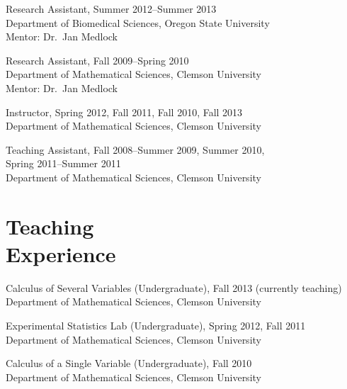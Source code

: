 \documentclass[margin,line,pifont,palatino,courier]{res}
\begin{document}
\begin{resume}
Research Assistant, Summer 2012--Summer 2013 \\
Department of Biomedical Sciences, Oregon State University \\
Mentor: Dr.~Jan Medlock


Research Assistant, Fall 2009--Spring 2010 \\
Department of Mathematical Sciences, Clemson University \\
Mentor: Dr.~Jan Medlock

Instructor, Spring 2012, Fall 2011, Fall 2010, Fall 2013 \\
Department of Mathematical Sciences, Clemson University

Teaching Assistant, Fall 2008--Summer 2009, Summer 2010, \\
Spring 2011--Summer 2011 \\
Department of Mathematical Sciences, Clemson University


\section{\sc Teaching \\ Experience}

Calculus of Several Variables (Undergraduate), Fall 2013 (currently teaching) \\
Department of Mathematical Sciences, Clemson University

Experimental Statistics Lab (Undergraduate), Spring 2012, Fall 2011 \\
Department of Mathematical Sciences, Clemson University

Calculus of a Single Variable (Undergraduate), Fall 2010 \\
Department of Mathematical Sciences, Clemson University








\end{resume}
\end{document}
